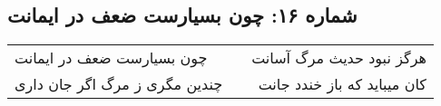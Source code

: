 \begin{center}
\section*{شماره ۱۶: چون بسیارست ضعف در ایمانت}
\label{sec:016}
\begin{longtable}{l p{0.5cm} r}
چون بسیارست ضعف در ایمانت
&&
هرگز نبود حدیث مرگ آسانت
\\
چندین مگری ز مرگ اگر جان داری
&&
کان میباید که باز خندد جانت
\\
\end{longtable}
\end{center}

